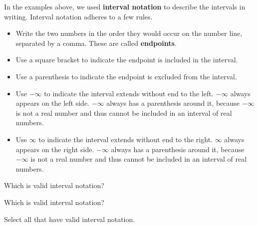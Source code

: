\documentclass{ximera}
\begin{document}
In the examples above, we used \textbf{interval notation} to describe the intervals in writing. Interval notation adheres to a few rules.

\begin{itemize}
\item Write the two numbers in the order they would occur on the number line, separated by a comma.  These are called \textbf{endpoints}.
\item Use a square bracket to indicate the endpoint is included in the interval.
\item Use a parenthesis to indicate the endpoint is excluded from the interval.
\item Use $-\infty$ to indicate the interval extends without end to the left. $-\infty$ always appears on the left side. $-\infty$ always has a parenthesis around it, because $-\infty$ is not a real number and thus cannot be included in an interval of real numbers.
\item Use $\infty$ to indicate the interval extends without end to the right. $\infty$ always appears on the right side. $-\infty$ always has a parenthesis around it, because $-\infty$ is not a real number and thus cannot be included in an interval of real numbers. 
\end{itemize}


\begin{problem}
Which is valid interval notation?
	\begin{multipleChoice}
	\choice {$[3, -2)$}
	\choice [correct]{$[-2, 3)$}
	\end{multipleChoice}
\end{problem}



\begin{problem}
Which is valid interval notation?
	\begin{multipleChoice}
	\choice {$[1, \infty]$}
	\choice [correct]{$[1, \infty)$}
	\end{multipleChoice}
\end{problem}



\begin{problem}
Select all that have valid interval notation.
	\begin{selectAll}
	\choice {$[-3, -5]$}
	\choice [correct]{$[1, 8)$}
	\choice [correct]{$(-\infty, -4]$}
	\choice {$[-\infty, 7)$}
	\choice [correct]{$(-1, 2]$}
	\choice {$[6, 2]$}
	\end{selectAll}
\end{problem}
\end{document}
